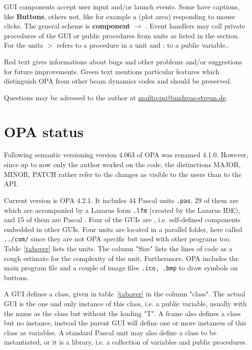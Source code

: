 \documentclass[12pt]{article}
\newcommand\code[1]{{\tt #1}}
\newcommand{\ofld}[1]{\colorbox{black!15}{{{\color{black}\bf #1}}}}
\newcommand{\ofldx}[1]{\colorbox{black!15}{{\color{black}(#1)}}}
\newcommand\guico[1]{{\color{blue}\code{#1}}}
\newcommand{\unico}[1]{{\color{burntorange}\code{#1}}}
\newcommand{\evcod}[2]{\ofld{#1} $\rightarrow$ \guico{#2}}
\newcommand{\prcod}[2]{\opauni{#1}$>$\unico{#2}}
\newcommand{\vrcod}[2]{\opauni{#1}:\unico{#2}}
\newcommand{\opagui}[1]{\colorbox{blue!20}{{\color{black}\code{#1}}}}
\newcommand{\opaguif}[1]{\colorbox{violet!30}{{\color{black}\code{#1}}}}
\newcommand{\opauni}[1]{\colorbox{orange!30}{{\color{black}\code{#1}}}}
\newcommand{\ouni}[1]{\hyperref[#1]{\opauni{#1}}}
\newcommand{\todo}[1]{{\color{red} #1}}
\newcommand{\feature}[1]{{\color{cadmiumgreen} #1}}
\begin{document}
GUI components accept user input and/or launch events. Some have captions, like \ofld{Buttons}, others not, like for example a \ofldx{plot area} responding to mouse clicks. The general scheme is \evcod{component}{event handler}. Event handlers may call private procedures of the GUI or public procedures from units as listed in the \guico{uses} section. For the units \prcod{unit}{procedure} refers to a procedure in a unit and \vrcod{unit}{variable} to a public variable..

\todo{Red text gives informations about bugs and other problems and/or suggestions for future improvements.} \feature{Green text mentions particular features which distinguish OPA from other beam dynamics codes and should be preserved.}

Questions may be adressed to the author at \url{mailto:psi@andreas-streun.de}.

\newpage


\section{OPA status}

Following semantic versioning \cite{semver} version 4.063 of OPA was renamed 4.1.0. However, since up to now only the author worked on the code, the distinctions MAJOR, MINOR, PATCH rather refer to the changes as visible to the users than to the API. 


Current version is OPA 4.2.1. It includes 44 Pascal units \code{.pas}, 29 of them are \opagui{GUIs} which are accompanied by a Lazarus form \code{.lfm} (created by the Lazarus IDE), and 15 of them are Pascal \opauni{units}. Four of the GUIs are \opaguif{frames}, i.e. self-defined components embedded in other GUIs. Four units are located in a parallel folder, here called \code{../com/} since they are not OPA specific but used with other programs too.
Table~\ref{tabover} lists the units. The column "Size" lists the lines of code as a rough estimate for the complexity of the unit. Furthermore, OPA includes the main program file \ouni{opa.lpr} and a couple of image files \code{.ico, .bmp} to draw symbols on buttons. 

A GUI defines a class, given in table~\ref{tabover} in the column "class". The actual GUI is the one and only instance of this class, i.e. a public variable, usually with the name as the class but without the leading "T". A frame also defines a class but no instance, instead the parent GUI will define one or more instances of this class as variables. A standard Pascal unit may also define a class to be instantiated, or it is a library, i.e. a collection of variables and public procedures.
\end{document}
